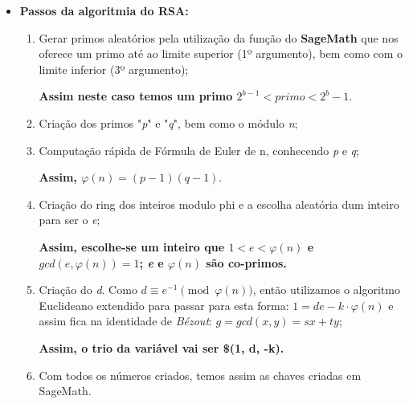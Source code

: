 \documentclass[12pt]{report}
\providecommand{\tightlist}{%
      \setlength{\itemsep}{0pt}\setlength{\parskip}{0pt}}
\begin{document}
\begin{itemize}

\item
  \textbf{Passos da algoritmia do RSA:}

\vspace{2 mm}
\begin{enumerate}
\def\labelenumi{\arabic{enumi}.}
\tightlist
\item
  Gerar primos aleatórios pela utilização da função do \textbf{SageMath}
  que nos oferece um primo até ao limite superior (1º argumento), bem
  como com o limite inferior (3º argumento);
\vspace{2 mm}

\textbf{Assim neste caso temos um primo \(2^{b-1} < primo < 2^b-1\)}.
\vspace{2 mm}

\item
  Criação dos primos "\emph{p}" e "\emph{q}", bem como o módulo \emph{n};
\vspace{2 mm}
\item
  Computação rápida de Fórmula de Euler de n, conhecendo \emph{p} e
  \emph{q};
\vspace{2 mm}

\textbf{Assim, \(\varphi(n) = (p − 1)(q − 1)\)}.
\vspace{2 mm}

\item
  Criação do ring dos inteiros modulo phi e a escolha aleatória dum
  inteiro para ser o \emph{e};
\vspace{2 mm}

\textbf{Assim, escolhe-se um inteiro que \(1 < e < φ(n)\) e
    \(gcd(e, φ(n)) = 1\);
    \emph{e} e \(φ(n)\) são co-primos.}
\vspace{2 mm}

\item
  Criação do \emph{d}. Como \(d \equiv e^{-1} \pmod{\varphi(n)}\), então
  utilizamos o algoritmo Euclideano extendido para passar para esta
  forma: \(1=de−k⋅\varphi(n)\) e assim fica na identidade de
  \emph{Bézout}: \(g = gcd(x,y) = sx + ty\);
\vspace{2 mm}

\textbf{Assim, o trio da variável vai ser \$(1, d, -k).}
\vspace{2 mm}

\item 
	Com todos os números criados, temos assim as chaves criadas em SageMath.
\end{enumerate}
\end{itemize}
\vspace{3 mm}
\end{document}
